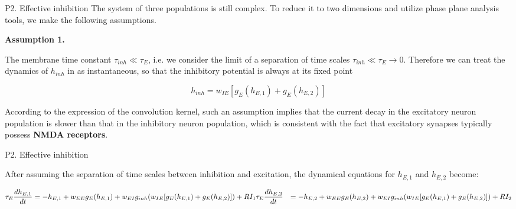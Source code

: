\documentclass[xcolor=table,dvipsnames,svgnames,aspectratio=169,fontset=fandol]{ctexbeamer}
\let\\\relax
\begin{document}
\begin{frame}{P2. Effective inhibition}
  The system of three populations is still complex. To reduce it to two dimensions and utilize phase plane analysis tools, we make the following assumptions.

  \vskip 5pt
\textbf{Assumption 1.}

\vskip 5pt
The membrane time constant $\tau_{inh} \ll \tau_{E}$, i.e. we consider the limit of a separation of time scales $\tau_{inh} \ll \tau_{E}\rightarrow 0$. Therefore we can treat the dynamics of $h_{inh}$ in as instantaneous, so that the inhibitory potential is always at its fixed point

$$h_{inh}=w_{IE}[g_E (h_{E,1})+g_E (h_{E,2})]$$

According to the expression of the convolution kernel, such an assumption implies that the current decay in the excitatory neuron population is slower than that in the inhibitory neuron population, which is consistent with the fact that excitatory synapses typically possess \textbf{NMDA receptors}.

\end{frame}

\begin{frame}{P2. Effective inhibition}

  After assuming the separation of time scales between inhibition and excitation, the dynamical equations for $h_{E,1}$ and $h_{E,2}$ become:

  \begin{equation*}
    \begin{aligned}
      \tau_E \frac{dh_{E,1}}{dt}&=-h_{E,1}+w_{EE}g_E (h_{E,1})+w_{EI}g_{inh} (w_{IE}[g_E (h_{E,1})+g_E (h_{E,2})])+RI_1\\
      \tau_E \frac{dh_{E,2}}{dt}&=-h_{E,2}+w_{EE}g_E (h_{E,2})+w_{EI}g_{inh} (w_{IE}[g_E (h_{E,1})+g_E (h_{E,2})])+RI_2
    \end{aligned}
  \end{equation*}

\end{frame}
\end{document}
